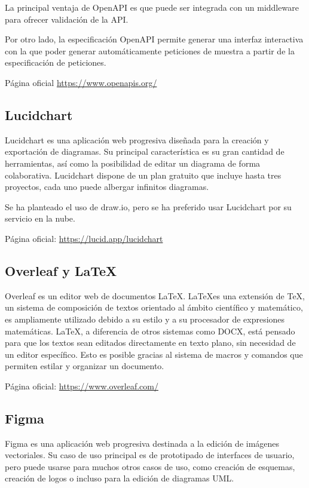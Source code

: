 La principal ventaja de OpenAPI es que puede ser integrada con un
middleware para ofrecer validación de la API.

Por otro lado, la especificación OpenAPI permite generar una interfaz
interactiva con la que poder generar automáticamente peticiones de
muestra a partir de la especificación de peticiones.

Página oficial \href{https://www.openapis.org/}{https://www.openapis.org/}

\subsection{Lucidchart}
Lucidchart es una aplicación web progresiva diseñada para la creación y exportación de diagramas. Su principal característica es su gran cantidad de herramientas, así como la posibilidad de editar un diagrama de forma colaborativa.
Lucidchart dispone de un plan gratuito que incluye hasta tres proyectos, cada uno puede albergar infinitos diagramas.

Se ha planteado el uso de draw.io, pero se ha preferido usar Lucidchart por su servicio en la nube. 

Página oficial: \href{https://lucid.app/lucidchart}{https://lucid.app/lucidchart}

\subsection{Overleaf y \LaTeX}
Overleaf es un editor web de documentos \LaTeX. \LaTeX es una extensión de \TeX, un sistema de composición de textos orientado al ámbito científico y matemático, es ampliamente utilizado debido a su estilo y a su procesador de expresiones matemáticas. \LaTeX, a diferencia de otros sistemas como DOCX, está pensado para que los textos sean editados directamente en texto plano, sin necesidad de un editor específico. Esto es posible gracias al sistema de macros y comandos que permiten estilar y organizar un documento. 

Página oficial: \href{https://www.overleaf.com/}{https://www.overleaf.com/}

\subsection{Figma}
Figma es una aplicación web progresiva destinada a la edición de imágenes vectoriales. Su caso de uso principal es de prototipado de interfaces de usuario, pero puede usarse para muchos otros casos de uso, como creación de esquemas, creación de logos o incluso para la edición de diagramas UML. 

